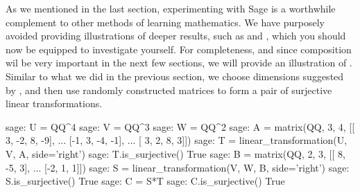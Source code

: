 As we mentioned in the last section, experimenting with Sage is a worthwhile complement to other methods of learning mathematics.  We have purposely avoided providing illustrations of deeper results, such as  and  , which you should now be equipped to investigate yourself.  For completeness, and since composition wil be very important in the next few sections, we will provide an illustration of .  Similar to what we did in the previous section, we choose dimensions suggested by , and then use randomly constructed matrices to form a pair of surjective linear transformations.
%
\begin{sageexample}
sage: U = QQ^4
sage: V = QQ^3
sage: W = QQ^2
sage: A = matrix(QQ, 3, 4, [[ 3, -2,  8, -9],
...                         [-1,  3, -4, -1],
...                         [ 3,  2,  8,  3]])
sage: T = linear_transformation(U, V, A, side='right')
sage: T.is_surjective()
True
sage: B = matrix(QQ, 2, 3, [[ 8, -5, 3],
...                         [-2,  1, 1]])
sage: S = linear_transformation(V, W, B, side='right')
sage: S.is_surjective()
True
sage: C = S*T
sage: C.is_surjective()
True
\end{sageexample}
%
\begin{sageverbatim}
\end{sageverbatim}
%

